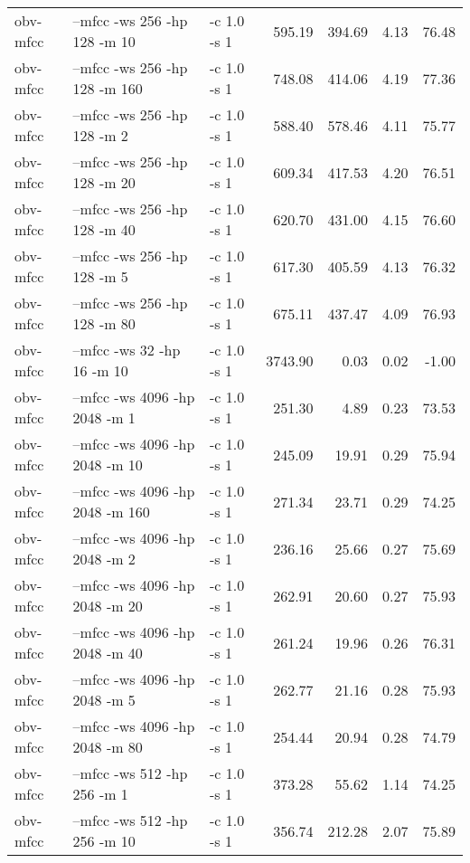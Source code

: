 \documentclass[11pt,a4paper]{article}
\begin{document}
\begin{tabular}{lllrrrr}
 obv-mfcc  &  --mfcc -ws 256  -hp 128  -m 10   &  -c 1.0 -s 1  &   595.19  &  394.69  &  4.13  &  76.48  \\
 obv-mfcc  &  --mfcc -ws 256  -hp 128  -m 160  &  -c 1.0 -s 1  &   748.08  &  414.06  &  4.19  &  77.36  \\
 obv-mfcc  &  --mfcc -ws 256  -hp 128  -m 2    &  -c 1.0 -s 1  &   588.40  &  578.46  &  4.11  &  75.77  \\
 obv-mfcc  &  --mfcc -ws 256  -hp 128  -m 20   &  -c 1.0 -s 1  &   609.34  &  417.53  &  4.20  &  76.51  \\
 obv-mfcc  &  --mfcc -ws 256  -hp 128  -m 40   &  -c 1.0 -s 1  &   620.70  &  431.00  &  4.15  &  76.60  \\
 obv-mfcc  &  --mfcc -ws 256  -hp 128  -m 5    &  -c 1.0 -s 1  &   617.30  &  405.59  &  4.13  &  76.32  \\
 obv-mfcc  &  --mfcc -ws 256  -hp 128  -m 80   &  -c 1.0 -s 1  &   675.11  &  437.47  &  4.09  &  76.93  \\
 obv-mfcc  &  --mfcc -ws 32   -hp 16   -m 10   &  -c 1.0 -s 1  &  3743.90  &    0.03  &  0.02  &  -1.00  \\
 obv-mfcc  &  --mfcc -ws 4096 -hp 2048 -m 1    &  -c 1.0 -s 1  &   251.30  &    4.89  &  0.23  &  73.53  \\
 obv-mfcc  &  --mfcc -ws 4096 -hp 2048 -m 10   &  -c 1.0 -s 1  &   245.09  &   19.91  &  0.29  &  75.94  \\
 obv-mfcc  &  --mfcc -ws 4096 -hp 2048 -m 160  &  -c 1.0 -s 1  &   271.34  &   23.71  &  0.29  &  74.25  \\
 obv-mfcc  &  --mfcc -ws 4096 -hp 2048 -m 2    &  -c 1.0 -s 1  &   236.16  &   25.66  &  0.27  &  75.69  \\
 obv-mfcc  &  --mfcc -ws 4096 -hp 2048 -m 20   &  -c 1.0 -s 1  &   262.91  &   20.60  &  0.27  &  75.93  \\
 obv-mfcc  &  --mfcc -ws 4096 -hp 2048 -m 40   &  -c 1.0 -s 1  &   261.24  &   19.96  &  0.26  &  76.31  \\
 obv-mfcc  &  --mfcc -ws 4096 -hp 2048 -m 5    &  -c 1.0 -s 1  &   262.77  &   21.16  &  0.28  &  75.93  \\
 obv-mfcc  &  --mfcc -ws 4096 -hp 2048 -m 80   &  -c 1.0 -s 1  &   254.44  &   20.94  &  0.28  &  74.79  \\
 obv-mfcc  &  --mfcc -ws 512  -hp 256  -m 1    &  -c 1.0 -s 1  &   373.28  &   55.62  &  1.14  &  74.25  \\
 obv-mfcc  &  --mfcc -ws 512  -hp 256  -m 10   &  -c 1.0 -s 1  &   356.74  &  212.28  &  2.07  &  75.89  \\

\end{tabular}
\end{document}
